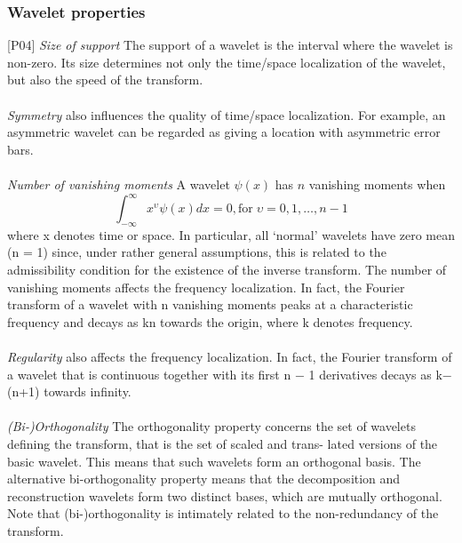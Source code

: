 \documentclass[12pt]{article}
\begin{document}
	 \subsubsection{Wavelet properties}
    [P04]
    \textit{Size of support} The support of a wavelet is the interval where the
    wavelet is non-zero. Its size determines not only the time/space localization 
    of the wavelet, but also the speed of the transform.\\
    \\
    \textit{Symmetry} also influences the quality of time/space localization. 
    For example, an asymmetric wavelet can be regarded as giving a location with 
    asymmetric error bars.\\
    \\
    \textit{Number of vanishing moments} A wavelet $\psi(x)$ has $n$ vanishing 
    moments when
    \begin{equation}
        \int_{-\infty}^\infty x^\upsilon \psi(x)dx=0, \mathrm{for }\;\upsilon = 0,1, \dots , n −1
    \end{equation}
    where x denotes time or space. In particular, all ‘normal’ wavelets have zero
    mean (n = 1) since, under rather general assumptions, this is related to the
    admissibility condition for the existence of the inverse transform. The number 
    of vanishing moments affects the frequency localization. In fact, the Fourier 
    transform of a wavelet with n vanishing moments peaks at a characteristic 
    frequency and decays as kn towards the origin, where k denotes frequency.\\
    \\
    \textit{Regularity} also affects the frequency localization. In fact, the 
    Fourier transform of a wavelet that is continuous together with its first 
    n − 1 derivatives decays as k−(n+1) towards infinity.\\
    \\
    \textit{(Bi-)Orthogonality} The orthogonality property concerns the set of 
    wavelets defining the transform, that is the set of scaled and trans- lated 
    versions of the basic wavelet. This means that such wavelets form an 
    orthogonal basis. The alternative bi-orthogonality property means that the
    decomposition and reconstruction wavelets form two distinct bases, which 
    are mutually orthogonal. Note that (bi-)orthogonality is intimately related
    to the non-redundancy of the transform.
	    
\end{document}
